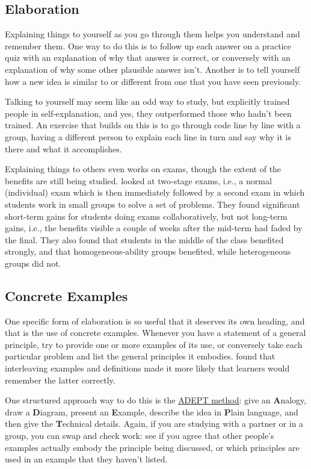 \subsection*{Elaboration}

Explaining things to yourself as you go through them helps you
understand and remember them.  One way to do this is to follow up each
answer on a practice quiz with an explanation of why that answer is
correct, or conversely with an explanation of why some other plausible
answer isn't.  Another is to tell yourself how a new idea is similar
to or different from one that you have seen previously.

Talking to yourself may seem like an odd way to study, but
\cite{Biel1995} explicitly trained people in self-explanation, and
yes, they outperformed those who hadn't been trained.  An exercise
that builds on this is to go through code line by line with a group,
having a different person to explain each line in turn and say why it
is there and what it accomplishes.

Explaining things to others even works on exams, though the extent of
the benefits are still being studied.  \cite{Cao2017a,Cao2017b} looked
at two-stage exams, i.e., a normal (individual) exam which is then
immediately followed by a second exam in which students work in small
groups to solve a set of problems.  They found significant short-term
gains for students doing exams collaboratively, but not long-term
gains, i.e., the benefits visible a couple of weeks after the mid-term
had faded by the final.  They also found that students in the middle
of the class benefited strongly, and that homogeneous-ability groups
benefited, while heterogeneous groups did not.

\subsection*{Concrete Examples}

One specific form of elaboration is so useful that it deserves its own
heading, and that is the use of concrete examples.  Whenever you have
a statement of a general principle, try to provide one or more
examples of its use, or conversely take each particular problem and
list the general principles it embodies.  \cite{Raws2014} found that
interleaving examples and definitions made it more likely that
learners would remember the latter correctly.

One structured approach way to do this is the
\href{https://betterexplained.com/articles/adept-method/}{ADEPT
  method}: give an \textbf{A}nalogy, draw a \textbf{D}iagram, present
an \textbf{E}xample, describe the idea in \textbf{P}lain language, and
then give the \textbf{T}echnical details.  Again, if you are studying
with a partner or in a group, you can swap and check work: see if you
agree that other people's examples actually embody the principle being
discussed, or which principles are used in an example that they
haven't listed.

